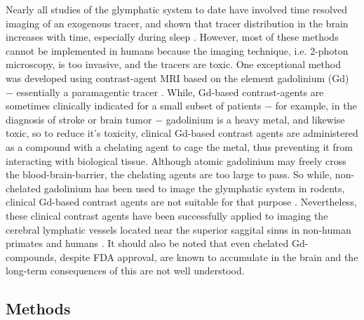 Nearly all studies of the glymphatic system to date have involved time resolved imaging of an exogenous tracer, and shown that tracer distribution in the brain increases with time, especially during sleep \citep{Iliff2012,Iliff2014,Xie,Peng2016}. However, most of these methods cannot be implemented in humans because the imaging technique, i.e. 2-photon microscopy, is too invasive, and the tracers are toxic. One exceptional method was developed using contrast-agent MRI based on the element gadolinium (Gd) $-$ essentially a paramagentic tracer \citep{Iliff2013,Yang2013}. While, Gd-based contrast-agents are sometimes clinically indicated for a small subset of patients $-$ for example, in the diagnosis of stroke or brain tumor $-$ gadolinium is a heavy metal, and likewise toxic, so to reduce it’s toxicity, clinical Gd-based contrast agents are administered as a compound with a chelating agent to cage the metal, thus preventing it from interacting with biological tissue. Although atomic gadolinium may freely cross the blood-brain-barrier, the chelating agents are too large to pass. So while, non-chelated gadolinium has been used to image the glymphatic system in rodents, clinical Gd-based contrast agents are not suitable for that purpose \citep{Iliff2013,Yang2013,Lee2015}. Nevertheless, these clinical contrast agents have been successfully applied to imaging the cerebral lymphatic vessels located near the superior saggital sinus in non-human primates and humans \citep{Absinta2017}. It should also be noted that even chelated Gd-compounds, despite FDA approval, are known to accumulate in the brain and the long-term consequences of this are not well understood.

\subsection*{Methods}
